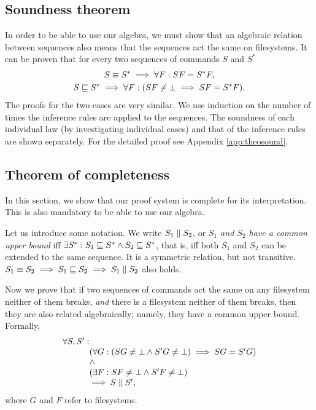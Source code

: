 \begin{table}[H]
\subsection{Soundness theorem}
\label{theorem:soundness}
In order to be able to use our algebra,
we must show that an algebraic relation between sequences also means
that the sequences act the same on filesystems.
%
It can be proven that for every two sequences of commands
\(S\) and \(S^*\) 
\begin{gather*}
S\equiv S^* \implies \forall F: SF=S^*F,\\
S\sqsubseteq S^* \implies \forall F: (SF\ne\bot \implies SF=S^*F).
\end{gather*}
The proofs for the two cases are very similar. We use induction on the
number of times the inference rules are applied to the sequences.
The soundness of each individual law
(by investigating individual cases)
and that of the inference rules are shown separately.
For the detailed proof see Appendix \ref{app:theosound}.

\medskip{}

\subsection{Theorem of completeness}
\label{theorem:completeness}
In this section, we show that our proof system is complete for its
interpretation. This is also mandatory to be able to use our algebra.

Let us introduce some notation. We write 
\(S_1\parallel S_2\), or \emph{\(S_1\) and \(S_2\) have a common upper 
bound} iff
\(\exists S^*: S_1\sqsubseteq S^* \wedge S_2\sqsubseteq S^*\), that is, iff
both \(S_1\) and \(S_2\) can be extended to the same sequence.
It is a symmetric relation, but not transitive.
\(S_1\equiv S_2\implies S_1\sqsubseteq S_2\implies S_1\parallel S_2\) also
holds.

Now we prove that if 
two sequences of commands act the same on any filesystem neither of
them breaks, \emph{and} there is a filesystem neither of them
breaks, then they are also related algebraically; namely, they have a common upper bound.
Formally, 
\[\begin{array}{r@{}l}
\forall S,S':&\\ 
&(\forall G: (SG\ne\ud\wedge S'G\ne\ud)\implies SG=S'G)\\
&\wedge\\
&(\exists F: SF\ne\ud\wedge S'F\ne\ud)\\
&\implies S \eqifnbr S',
\end{array}\]
where \(G\) and \(F\) refer to filesystems. 



\end{table}
